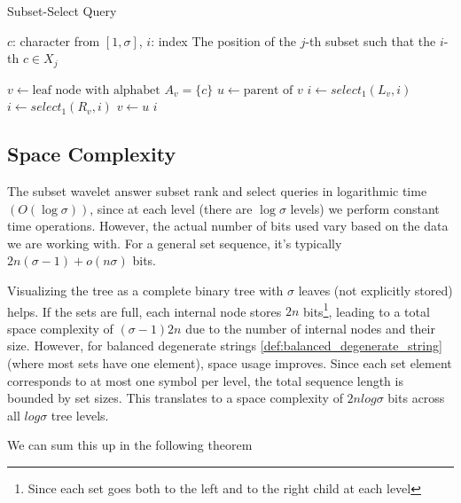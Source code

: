 \begin{algorithm}[h]
    \caption{Subset-Select Query}
    \label{alg:subset-access}
    \begin{algorithmic}[1]
        \Require $c$: character from $[1, \sigma]$, $i$: index
        \Ensure The position of the $j$-th subset such that the $i$-th $c \in X_j$
    \end{algorithmic}
    \begin{algorithmic}
        \State $v \gets \text{leaf node with alphabet } A_v = \{c\}$
         
        \State $u \gets \text{parent of } v$
        \State $i \gets select_1(L_v, i)$
        \Else
        \State $i \gets select_1(R_v, i)$
        \EndIf
        \State $v \gets u$
        \EndWhile
        \State \Return $i$
        \EndFunction
    \end{algorithmic}
\end{algorithm}

\subsection*{Space Complexity}
The subset wavelet answer subset rank and select queries in logarithmic time $(O(\log \sigma))$, since at each level (there are $\log \sigma$ levels) we perform constant time operations. However, the actual number of bits used vary based on the data we are working with. For a general set sequence, it's typically $2n(\sigma - 1) + o(n\sigma)$ bits. \vspace{0.4cm}

\noindent Visualizing the tree as a complete binary tree with $\sigma$ leaves (not explicitly stored) helps. If the sets are full, each internal node stores $2n$ bits\footnote{Since each set goes both to the left and to the right child at each level}, leading to a total space complexity of $(\sigma - 1)2n$ due to the number of internal nodes and their size. However, for balanced degenerate strings \ref{def:balanced_degenerate_string} (where most sets have one element), space usage improves. Since each set element corresponds to at most one symbol per level, the total sequence length is bounded by set sizes. This translates to a space complexity of $2n log \sigma$ bits across all $log \sigma$ tree levels. \vspace{0.4cm}

\noindent We can sum this up in the following theorem

